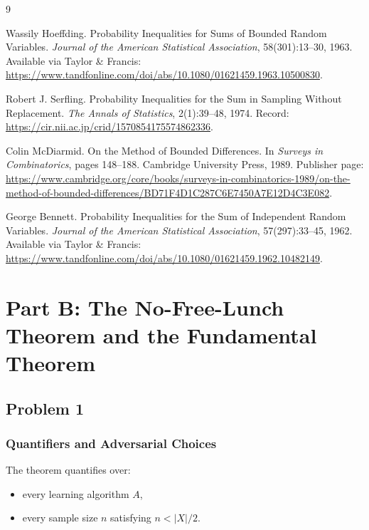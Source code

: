 \documentclass{article}
\theoremstyle{definition}
\theoremstyle{remark}
\begin{document}
\begin{thebibliography}{9}

Wassily Hoeffding.
\newblock Probability Inequalities for Sums of Bounded Random Variables.
\newblock \emph{Journal of the American Statistical Association}, 58(301):13--30, 1963.
\newblock Available via Taylor \& Francis:
\url{https://www.tandfonline.com/doi/abs/10.1080/01621459.1963.10500830}.

Robert J. Serfling.
\newblock Probability Inequalities for the Sum in Sampling Without Replacement.
\newblock \emph{The Annals of Statistics}, 2(1):39--48, 1974.
\newblock Record:
\url{https://cir.nii.ac.jp/crid/1570854175574862336}.

Colin McDiarmid.
\newblock On the Method of Bounded Differences.
\newblock In \emph{Surveys in Combinatorics}, pages 148--188. Cambridge University Press, 1989.
\newblock Publisher page:
\url{https://www.cambridge.org/core/books/surveys-in-combinatorics-1989/on-the-method-of-bounded-differences/BD71F4D1C287C6E7450A7E12D4C3E082}.

George Bennett.
\newblock Probability Inequalities for the Sum of Independent Random Variables.
\newblock \emph{Journal of the American Statistical Association}, 57(297):33--45, 1962.
\newblock Available via Taylor \& Francis:
\url{https://www.tandfonline.com/doi/abs/10.1080/01621459.1962.10482149}.

\end{thebibliography}

\newpage
\section{Part B: The No-Free-Lunch Theorem and the Fundamental Theorem}

\subsection{Problem 1}

\subsubsection{Quantifiers and Adversarial Choices}

The theorem quantifies over:
\begin{itemize}
\item every learning algorithm $A$,
\item every sample size $n$ satisfying $n<|X|/2$.
\end{itemize}
\end{document}
